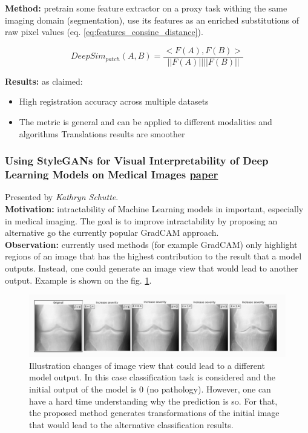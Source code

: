 {\bf Method:} pretrain some feature extractor on a proxy task withing the same imaging domain (segmentation), use its features as an enriched substitutions of raw pixel values (eq. \ref{eq:features_consine_distance}). 

\begin{equation}
    DeepSim_{patch} (A, B) = \frac{< F(A), F(B) >}{|| F(A) || || F(B) ||}
    \label{eq:features_consine_distance}
\end{equation}

{\bf Results:} as claimed:
\begin{itemize}
    \item High registration accuracy across multiple datasets
    \item The metric is general and can be applied to different modalities and algorithms 
    \itema Translations results are smoother
\end{itemize}





\subsubsection{Using StyleGANs for Visual Interpretability of Deep Learning Models on Medical Images \href{http://www.cse.cuhk.edu.hk/~qdou/public/medneurips2020/70_neurips2020_cameraready_opt.pdf}{paper}}

Presented by \textit{Kathryn Schutte}. \\

{\bf Motivation:} intractability of Machine Learning models in important, especially in medical imaging. 
The goal is to improve intractability by proposing an alternative go the currently popular GradCAM \cite{SelvarajuCDVPB17} approach. \\

{\bf Observation:} currently used methods (for example GradCAM) only highlight regions of an image that has the highest contribution to the result that a model outputs.
Instead, one could generate an image view that would lead to another output. Example is shown on the fig. \ref{fig:gradual_changes}. \\

\begin{figure}[h!]
    \centering
    \includegraphics[scale=0.4]{neurips-2020/images/Screenshot 2020-12-15 at 20.22.51.png}
    \caption{Illustration changes of image view that could lead to a different model output. In this case classification task is considered and the initial output of the model is 0 (no pathology). However, one can have a hard time understanding why the prediction is so. For that, the proposed method generates transformations of the initial image that would lead to the alternative classification results.}
    \label{fig:gradual_changes}
\end{figure}

